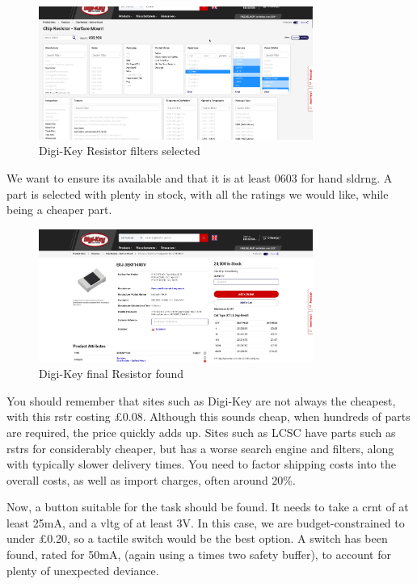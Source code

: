 \documentclass[a4paper,11pt]{report}
\begin{document}
\begin{figure}[H]
\centering
\includegraphics[width=0.8\textwidth]{screenshots/DigiKeyResistor}
\caption{Digi-Key Resistor filters selected}
\end{figure}

We want to ensure its available and that it is at least 0603 for hand \gls{sldrng}. A part is selected with plenty in stock, with all the ratings we would like, while being a cheaper part.

\begin{figure}[H]
\centering
\includegraphics[width=0.8\textwidth]{screenshots/DigiKeyResistorSelected}
\caption{Digi-Key final Resistor found}
\end{figure}

You should remember that sites such as Digi-Key are not always the cheapest, with this \gls{rstr} costing £0.08. Although this sounds cheap, when hundreds of parts are required, the price quickly adds up. Sites such as LCSC have parts such as \gls{rstr}s for considerably cheaper, but has a worse search engine and filters, along with typically slower delivery times. You need to factor shipping costs into the overall costs, as well as import charges, often around 20\%.

Now, a button suitable for the task should be found. It needs to take a \gls{crnt} of at least 25mA, and a \gls{vltg} of at least 3V. In this case, we are budget-constrained to under £0.20, so a tactile switch would be the best option. A switch has been found, rated for 50mA, (again using a times two safety buffer), to account for plenty of unexpected deviance.
\end{document}
